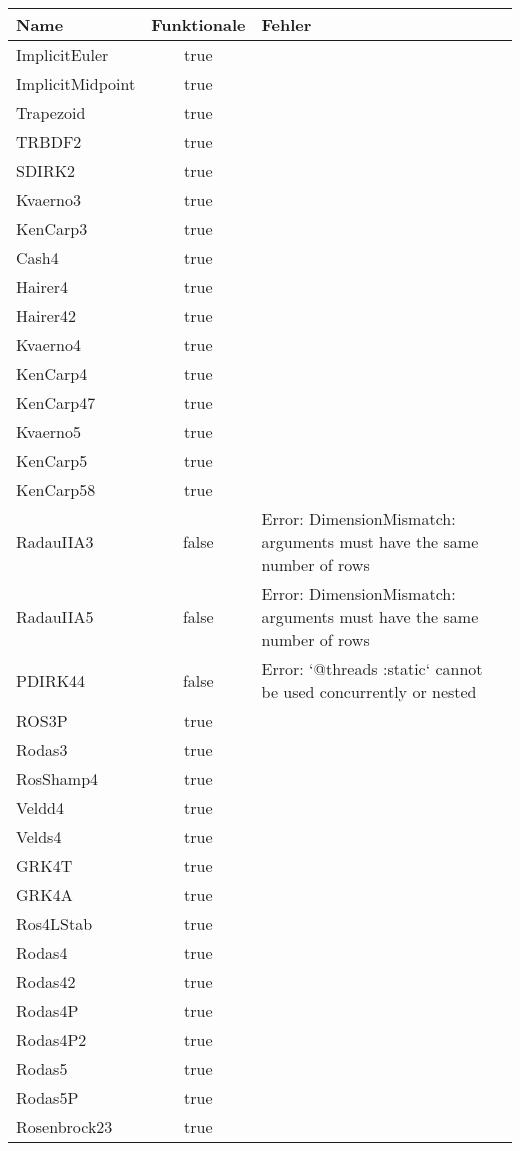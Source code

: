 \begin{table}[]
    \centering

    \begin{tabular}{p{5cm}|c|p{5cm}}
        Name & Funktionale & Fehler \\
        \hline\hline
        ImplicitEuler & true & \\ 
ImplicitMidpoint & true & \\ 
Trapezoid & true & \\ 
TRBDF2 & true & \\ 
SDIRK2 & true & \\ 
Kvaerno3 & true & \\ 
KenCarp3 & true & \\ 
Cash4 & true & \\ 
Hairer4 & true & \\ 
Hairer42 & true & \\ 
Kvaerno4 & true & \\ 
KenCarp4 & true & \\ 
KenCarp47 & true & \\ 
Kvaerno5 & true & \\ 
KenCarp5 & true & \\ 
KenCarp58 & true & \\ 
RadauIIA3 & false & Error: DimensionMismatch: arguments must have the same number of rows \\
RadauIIA5 & false & Error: DimensionMismatch: arguments must have the same number of rows \\
PDIRK44 & false & Error: `@threads :static` cannot be used concurrently or nested \\
ROS3P & true & \\ 
Rodas3 & true & \\ 
RosShamp4 & true & \\ 
Veldd4 & true & \\ 
Velds4 & true & \\ 
GRK4T & true & \\ 
GRK4A & true & \\ 
Ros4LStab & true & \\ 
Rodas4 & true & \\ 
Rodas42 & true & \\ 
Rodas4P & true & \\ 
Rodas4P2 & true & \\ 
Rodas5 & true & \\ 
Rodas5P & true & \\ 
Rosenbrock23 & true & \\ 

\end{tabular}
\end{table}
